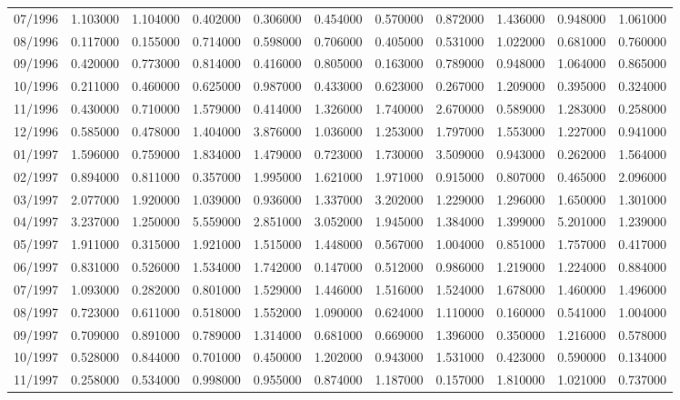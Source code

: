 \begin{tabular}{lrrrrrrrrrr}
07/1996 & 1.103000 & 1.104000 & 0.402000 & 0.306000 & 0.454000 & 0.570000 & 0.872000 & 1.436000 & 0.948000 & 1.061000 \\
08/1996 & 0.117000 & 0.155000 & 0.714000 & 0.598000 & 0.706000 & 0.405000 & 0.531000 & 1.022000 & 0.681000 & 0.760000 \\
09/1996 & 0.420000 & 0.773000 & 0.814000 & 0.416000 & 0.805000 & 0.163000 & 0.789000 & 0.948000 & 1.064000 & 0.865000 \\
10/1996 & 0.211000 & 0.460000 & 0.625000 & 0.987000 & 0.433000 & 0.623000 & 0.267000 & 1.209000 & 0.395000 & 0.324000 \\
11/1996 & 0.430000 & 0.710000 & 1.579000 & 0.414000 & 1.326000 & 1.740000 & 2.670000 & 0.589000 & 1.283000 & 0.258000 \\
12/1996 & 0.585000 & 0.478000 & 1.404000 & 3.876000 & 1.036000 & 1.253000 & 1.797000 & 1.553000 & 1.227000 & 0.941000 \\
01/1997 & 1.596000 & 0.759000 & 1.834000 & 1.479000 & 0.723000 & 1.730000 & 3.509000 & 0.943000 & 0.262000 & 1.564000 \\
02/1997 & 0.894000 & 0.811000 & 0.357000 & 1.995000 & 1.621000 & 1.971000 & 0.915000 & 0.807000 & 0.465000 & 2.096000 \\
03/1997 & 2.077000 & 1.920000 & 1.039000 & 0.936000 & 1.337000 & 3.202000 & 1.229000 & 1.296000 & 1.650000 & 1.301000 \\
04/1997 & 3.237000 & 1.250000 & 5.559000 & 2.851000 & 3.052000 & 1.945000 & 1.384000 & 1.399000 & 5.201000 & 1.239000 \\
05/1997 & 1.911000 & 0.315000 & 1.921000 & 1.515000 & 1.448000 & 0.567000 & 1.004000 & 0.851000 & 1.757000 & 0.417000 \\
06/1997 & 0.831000 & 0.526000 & 1.534000 & 1.742000 & 0.147000 & 0.512000 & 0.986000 & 1.219000 & 1.224000 & 0.884000 \\
07/1997 & 1.093000 & 0.282000 & 0.801000 & 1.529000 & 1.446000 & 1.516000 & 1.524000 & 1.678000 & 1.460000 & 1.496000 \\
08/1997 & 0.723000 & 0.611000 & 0.518000 & 1.552000 & 1.090000 & 0.624000 & 1.110000 & 0.160000 & 0.541000 & 1.004000 \\
09/1997 & 0.709000 & 0.891000 & 0.789000 & 1.314000 & 0.681000 & 0.669000 & 1.396000 & 0.350000 & 1.216000 & 0.578000 \\
10/1997 & 0.528000 & 0.844000 & 0.701000 & 0.450000 & 1.202000 & 0.943000 & 1.531000 & 0.423000 & 0.590000 & 0.134000 \\
11/1997 & 0.258000 & 0.534000 & 0.998000 & 0.955000 & 0.874000 & 1.187000 & 0.157000 & 1.810000 & 1.021000 & 0.737000 \\

\end{tabular}
